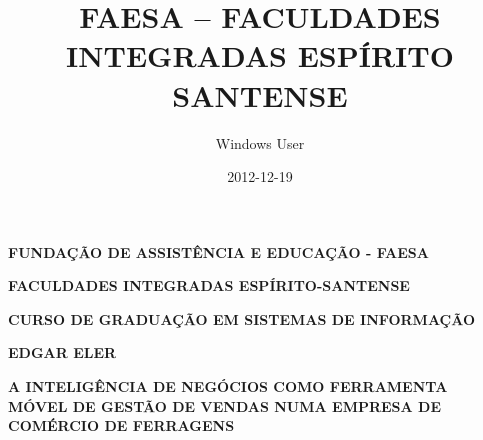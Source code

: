 \documentclass[a4paper]{article}
\title{FAESA -- FACULDADES INTEGRADAS ESP\'IRITO SANTENSE}
\author{Windows User}
\date{2012-12-19}
\begin{document}
\clearpage\setcounter{page}{1}\pagestyle{Standard}
{\centering{}\sffamily\bfseries
FUNDA\c{C}\~AO DE ASSIST\^ENCIA E EDUCA\c{C}\~AO - FAESA
\par}

{\centering{}\sffamily\bfseries
FACULDADES INTEGRADAS ESP\'IRITO-SANTENSE
\par}

{\centering{}\sffamily\bfseries
CURSO DE GRADUA\c{C}\~AO EM SISTEMAS DE INFORMA\c{C}\~AO
\par}


\bigskip


\bigskip


\bigskip


\bigskip


\bigskip


\bigskip


\bigskip


\bigskip


\bigskip

{\centering{}\sffamily\bfseries
EDGAR ELER
\par}


\bigskip


\bigskip


\bigskip


\bigskip


\bigskip


\bigskip


\bigskip


\bigskip


\bigskip


\bigskip


\bigskip

{\centering{}
\textsf{\textbf{A INTELIG\^ENCIA DE NEG\'OCIOS COMO FERRAMENTA M\'OVEL DE GEST\~AO DE VENDAS NUMA EMPRESA DE COM\'ERCIO
DE FERRAGENS}}
\par}


\bigskip


\bigskip


\bigskip


\bigskip


\bigskip


\bigskip


\bigskip


\bigskip


\bigskip


\bigskip


\bigskip
\end{document}
